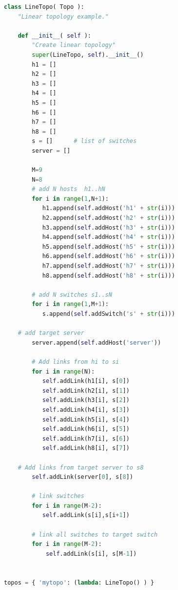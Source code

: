 \begin{lstlisting}[language=python, caption=DDoS Simulation Network Topology]
class LineTopo( Topo ):
    "Linear topology example."

    def __init__( self ):
        "Create linear topology"
        super(LineTopo, self).__init__()
        h1 = []
        h2 = []
        h3 = []
        h4 = []
        h5 = []
        h6 = []
        h7 = []
        h8 = []
        s = []		# list of switches
        server = []

        M=9
        N=8
        # add N hosts  h1..hN
        for i in range(1,N+1):
           h1.append(self.addHost('h1' + str(i)))
           h2.append(self.addHost('h2' + str(i)))
           h3.append(self.addHost('h3' + str(i)))
           h4.append(self.addHost('h4' + str(i)))
           h5.append(self.addHost('h5' + str(i)))
           h6.append(self.addHost('h6' + str(i)))
           h7.append(self.addHost('h7' + str(i)))
           h8.append(self.addHost('h8' + str(i)))

        # add N switches s1..sN
        for i in range(1,M+1):
           s.append(self.addSwitch('s' + str(i)))

	# add target server
        server.append(self.addHost('server'))

        # Add links from hi to si
        for i in range(N):
           self.addLink(h1[i], s[0])
           self.addLink(h2[i], s[1])
           self.addLink(h3[i], s[2])
           self.addLink(h4[i], s[3])
           self.addLink(h5[i], s[4])
           self.addLink(h6[i], s[5])
           self.addLink(h7[i], s[6])
           self.addLink(h8[i], s[7])

	# Add links from target server to s8
        self.addLink(server[0], s[8])

        # link switches
        for i in range(M-2):
           self.addLink(s[i],s[i+1])

        # link all switches to target switch
        for i in range(M-2):
            self.addLink(s[i], s[M-1])


topos = { 'mytopo': (lambda: LineTopo() ) }
\end{lstlisting}
